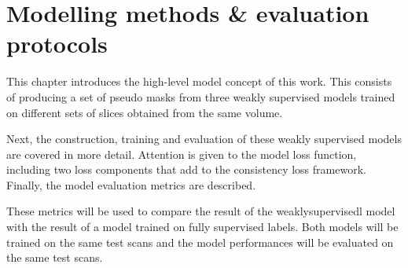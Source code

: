 
\chapter{Modelling methods \& evaluation protocols}\thispagestyle{empty}
\par{
    This chapter introduces the high-level model concept of this work.
    This consists of producing a set of pseudo masks from three weakly supervised models trained on different sets of slices obtained from the same volume.
}
\par{
    Next, the construction, training and evaluation of these weakly supervised models are covered in more detail.
    Attention is given to the model loss function, including two loss components that add to the consistency loss framework\cite{Laradji2021}.
    Finally, the model evaluation metrics are described.
}
\par{
    These metrics will be used to compare the result of the \Gls{weaklysupervisedl} model with the result of a model trained on fully supervised labels.
    Both models will be trained on the same test scans and the model performances will be evaluated on the same test scans.
}

\FloatBarrier



